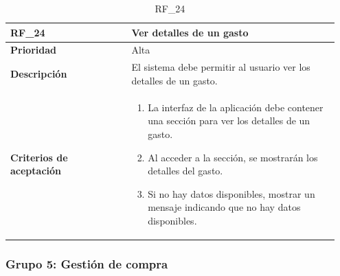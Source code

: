 \begin{table}[htb!]
    \begin{tabular}{|p{0.35\linewidth}|p{0.6\linewidth}|}
        \hline
        \rowcolor[HTML]{C0C0C0}  
        \textbf{RF\_24} & \textbf{Ver detalles de un gasto} \\
        \hline
        \textbf{Prioridad} & Alta \\
        \hline
        \textbf{Descripción} & El sistema debe permitir al usuario ver los detalles de un gasto.  \\
        \hline
        \vspace{0.5mm}
        \textbf{Criterios de aceptación} & 
        \begin{minipage}[t]{0.9\linewidth}
            \begin{enumerate}
                \item La interfaz de la aplicación debe contener una sección para ver los detalles de un gasto.
                \item Al acceder a la sección, se mostrarán los detalles del gasto.
                \item Si no hay datos disponibles, mostrar un mensaje indicando que no hay datos disponibles.
            \end{enumerate}
            \vspace{2mm}
        \end{minipage} \\
        \hline
    \end{tabular}
    \caption{RF\_24}
    \label{req:RF24}
\end{table}
\clearpage




\subsubsection{Grupo 5: Gestión de compra}
\label{subsubsec:grupo5}

